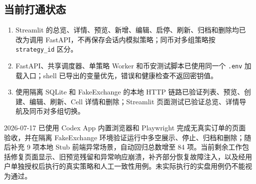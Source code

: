 \subsection{当前打通状态}

\begin{enumerate}
  \item Streamlit 的总览、详情、预览、新增、编辑、启停、刷新、归档和删除均已改为调用 FastAPI，不再保存会话内模拟策略；同币对多组策略按 \texttt{strategy\_id} 区分。
  \item FastAPI、共享调度器、单策略 Worker 和币安测试脚本已使用同一个 \texttt{.env} 加载入口；shell 已导出的变量优先，错误和健康检查不返回密钥值。
  \item 使用隔离 SQLite 和 FakeExchange 的本地 HTTP 链路已验证列表、预览、创建、编辑、刷新、Cell 详情和删除；Streamlit 页面测试已验证总览、详情导航及同币对多组切换。
\end{enumerate}

2026-07-17 已使用 Codex App 内置浏览器和 Playwright 完成无真实订单的页面验收，并在隔离 FakeExchange 环境验证运行中多空展示、停止、归档和删除；随后补充 9 项本地 Stub 前端异常场景，自动回归总数增至 84 项。当前剩余工作包括修复页面显示、旧预览残留和异常响应崩溃，补齐部分恢复故障注入，以及经用户单独授权后执行的真实策略和人工一致性用例。未实际执行的实盘用例仍不能视为通过。
